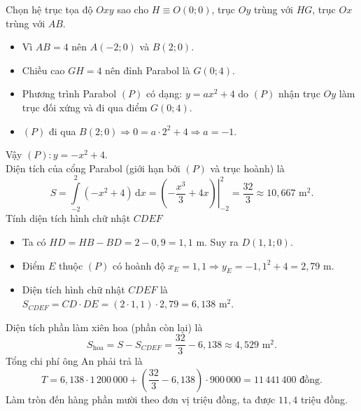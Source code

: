 \begin{ex}
{\begin{center}
\end{center}
Chọn hệ trục tọa độ $Oxy$ sao cho $H \equiv O(0;0)$, trục $Oy$ trùng với $HG$, trục $Ox$ trùng với $AB$.
\begin{itemize}
\item Vì $AB = 4$ nên $A(-2;0)$ và $B(2;0)$.
\item Chiều cao $GH = 4$ nên đỉnh Parabol là $G(0;4)$.
\item Phương trình Parabol $(P)$ có dạng: $y = ax^2 + 4$ do $(P)$ nhận trục $Oy$ làm trục đối xứng và đi qua điểm $G(0;4)$.
\item $(P)$ đi qua $B(2;0) \Rightarrow 0 = a\cdot 2^2 + 4 \Rightarrow a = -1$.
\end{itemize}
Vậy $(P) \colon  y = -x^2 + 4$.\\
Diện tích của cổng Parabol (giới hạn bởi $(P)$ và trục hoành) là
\[S = \displaystyle\int\limits_{-2}^{2} (-x^2 + 4) \mathrm{\,d}x = \left. \left( -\dfrac{x^3}{3} + 4x \right) \right|_{-2}^{2} = \frac{32}{3} \approx 10,667 \text{ m}^2.\]
Tính diện tích hình chữ nhật $CDEF$
\begin{itemize}
\item Ta có $HD = HB - BD = 2 - 0{,}9 = 1{,}1$ m. Suy ra $D(1,1; 0)$.
\item Điểm $E$ thuộc $(P)$ có hoành độ $x_E = 1{,}1 \Rightarrow y_E = -1{,}1^2 + 4 = 2{,}79$ m.
\item Diện tích hình chữ nhật $CDEF$ là $S_{CDEF} = CD \cdot DE = (2 \cdot  1{,}1) \cdot 2{,}79 = 6{,}138$ m$^2$.
\end{itemize}
Diện tích phần làm xiên hoa (phần còn lại) là
\[S_{\text{hoa}} = S - S_{CDEF} = \dfrac{32}{3} - 6{,}138 \approx 4{,}529 \text{ m}^2.\]
Tổng chi phí ông An phải trả là
\[T = 6,138 \cdot 1\,200\,000 + \left( \dfrac{32}{3} - 6,138 \right) \cdot 900\,000 = 11\,441\,400 \text{ đồng}.\]
Làm tròn đến hàng phần mười theo đơn vị triệu đồng, ta được $11{,}4$ triệu đồng.
}
\end{ex}

